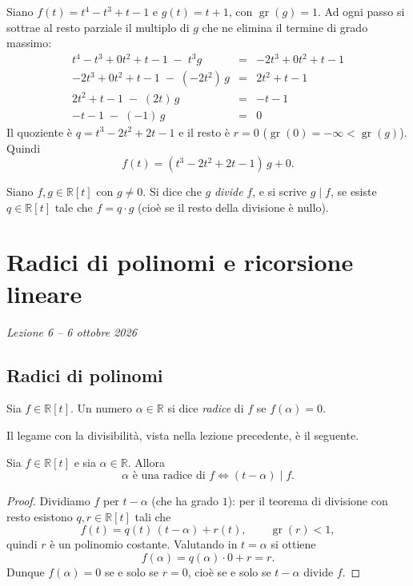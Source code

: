 \documentclass[11pt,a4paper]{article}
\begin{document}
\begin{esempio}
Siano $f(t) = t^4 - t^3 + t - 1$ e $g(t) = t + 1$, con
$\operatorname{gr}(g) = 1$. Ad ogni passo si sottrae al resto parziale il
multiplo di $g$ che ne elimina il termine di grado massimo:
\[
\begin{array}{rcl}
  t^4 - t^3 + 0t^2 + t - 1 \;-\; t^3 g &=& -2t^3 + 0t^2 + t - 1 \\
  -2t^3 + 0t^2 + t - 1 \;-\; (-2t^2)\, g &=& 2t^2 + t - 1 \\
  2t^2 + t - 1 \;-\; (2t)\, g &=& -t - 1 \\
  -t - 1 \;-\; (-1)\, g &=& 0
\end{array}
\]
Il quoziente è $q = t^3 - 2t^2 + 2t - 1$ e il resto è $r = 0$
($\operatorname{gr}(0) = -\infty < \operatorname{gr}(g)$). Quindi
\[
  f(t) = (t^3 - 2t^2 + 2t - 1)\, g + 0 .
\]
\end{esempio}

\begin{definizione}
Siano $f, g \in \mathbb{R}[t]$ con $g \neq 0$. Si dice che $g$ \emph{divide}
$f$, e si scrive $g \mid f$, se esiste $q \in \mathbb{R}[t]$ tale che
$f = q \cdot g$ (cioè se il resto della divisione è nullo).
\end{definizione}

\section[Radici di polinomi e ricorsione lineare (Lezione 6 -- 6 ottobre 2026)]{Radici di polinomi e ricorsione lineare}
\noindent\emph{Lezione 6 -- 6 ottobre 2026}
\subsection{Radici di polinomi}

\begin{definizione}
Sia $f \in \mathbb{R}[t]$. Un numero $\alpha \in \mathbb{R}$ si dice \emph{radice}
di $f$ se $f(\alpha) = 0$.
\end{definizione}

Il legame con la divisibilità, vista nella lezione precedente, è il seguente.

\begin{teorema}
Sia $f \in \mathbb{R}[t]$ e sia $\alpha \in \mathbb{R}$. Allora
\[
  \alpha \text{ è una radice di } f
  \iff
  (t - \alpha) \mid f .
\]
\end{teorema}

\begin{proof}
Dividiamo $f$ per $t - \alpha$ (che ha grado $1$): per il teorema di divisione
con resto esistono $q, r \in \mathbb{R}[t]$ tali che
\[
  f(t) = q(t)\,(t - \alpha) + r(t), \qquad \operatorname{gr}(r) < 1 ,
\]
quindi $r$ è un polinomio costante. Valutando in $t = \alpha$ si ottiene
\[
  f(\alpha) = q(\alpha)\cdot 0 + r = r .
\]
Dunque $f(\alpha) = 0$ se e solo se $r = 0$, cioè se e solo se $t - \alpha$
divide $f$.
\end{proof}
\end{document}
